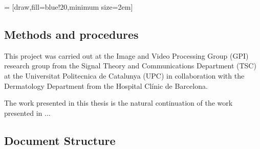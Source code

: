 \documentclass[../main.tex]{subfiles}
\begin{document}
 = [draw,fill=blue!20,minimum size=2em]




\subsection{Methods and procedures}
\label{sec:methods-and-procedures}
This project was carried out at the Image and Video Processing Group (GPI) research
group from the Signal Theory and Communications Department (TSC) at the Universitat
Politecnica de Catalunya (UPC) in collaboration with the Dermatology Department from
the Hospital Clínic de Barcelona.

The work presented in this thesis is the natural continuation of the work presented
in \cite{Combalia2019}...

\subsection{Document Structure}
\lipsum[2]
\end{document}
